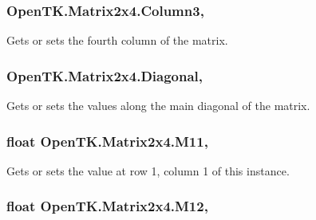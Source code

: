 \hypertarget{struct_open_t_k_1_1_matrix2x4_a5faf1c70040806cddb2f43e54da6ebe4}{
\subsubsection[{Column3}]{ Open\-T\-K.\-Matrix2x4.\-Column3\hspace{0.3cm}{\ttfamily [get]}, {\ttfamily [set]}}}\label{struct_open_t_k_1_1_matrix2x4_a5faf1c70040806cddb2f43e54da6ebe4}


Gets or sets the fourth column of the matrix. 

\hypertarget{struct_open_t_k_1_1_matrix2x4_a44f6f077bf540d62c60bc37d50726c1e}{
\subsubsection[{Diagonal}]{ Open\-T\-K.\-Matrix2x4.\-Diagonal\hspace{0.3cm}{\ttfamily [get]}, {\ttfamily [set]}}}\label{struct_open_t_k_1_1_matrix2x4_a44f6f077bf540d62c60bc37d50726c1e}


Gets or sets the values along the main diagonal of the matrix. 

\hypertarget{struct_open_t_k_1_1_matrix2x4_ae7856857d4432b5801edbc356eef6c12}{
\subsubsection[{M11}]{\setlength{\rightskip}{0pt plus 5cm}float Open\-T\-K.\-Matrix2x4.\-M11\hspace{0.3cm}{\ttfamily [get]}, {\ttfamily [set]}}}\label{struct_open_t_k_1_1_matrix2x4_ae7856857d4432b5801edbc356eef6c12}


Gets or sets the value at row 1, column 1 of this instance. 

\hypertarget{struct_open_t_k_1_1_matrix2x4_a312c88eb1939f9d277dbbcdb769d585b}{
\subsubsection[{M12}]{\setlength{\rightskip}{0pt plus 5cm}float Open\-T\-K.\-Matrix2x4.\-M12\hspace{0.3cm}{\ttfamily [get]}, {\ttfamily [set]}}}\label{struct_open_t_k_1_1_matrix2x4_a312c88eb1939f9d277dbbcdb769d585b}


